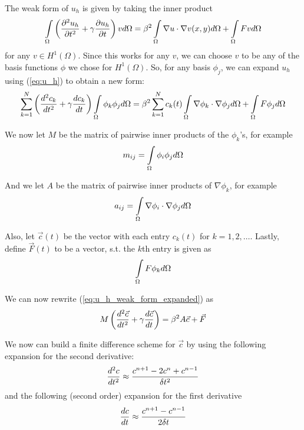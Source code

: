 \documentclass[a4paper,12pt]{article}
\begin{document}
The weak form of $u_h$ is given by taking the inner product 
\begin{equation} \label{eq:u_h_weak_form}
\int\limits_{\Omega}  \left( \frac{\partial^2 u_h}{\partial t^2} + \gamma \frac{\partial u_h}{\partial t} \right)   v  d\Omega
=
\beta^2 \int\limits_{\Omega} \nabla u \cdot \nabla v(x,y) d\Omega
+ \int\limits_{\Omega} F v d\Omega
\end{equation}
for any $v \in H^1(\Omega)$. Since this works for any $v$, we can choose $v$ to be any of the basis functions $\phi$
we chose for $H^1(\Omega)$. So, for any basis $\phi_j$, we can expand $u_h$ using (\ref{eq:u_h}) to obtain a new form:
\begin{equation} \label{eq:u_h_weak_form_expanded}
\sum\limits_{k=1}^N \left( \frac{d^2 c_k}{d t^2} + \gamma\frac{d c_k}{d t} \right) \int\limits_{\Omega} \phi_k \phi_j d\Omega
=
\beta^2\sum\limits_{k=1}^N c_k(t) \int\limits_{\Omega} \nabla \phi_k \cdot \nabla \phi_j d\Omega
+
\int\limits_{\Omega} F \phi_j d\Omega
\end{equation}

We now let $M$ be the matrix of pairwise inner products of the $\phi_k$'s, for example
\begin{equation} \label{eq:m_definition}
m_{ij} = \int\limits_{\Omega} \phi_i \phi_j d\Omega
\end{equation}

And we let $A$ be the matrix of pairwise inner products of $\nabla \phi_k$, for example
\begin{equation} \label{eq:a_definition}
a_{ij} = \int\limits_{\Omega} \nabla \phi_i \cdot \nabla \phi_j d\Omega
\end{equation}

Also, let $\vec{c}(t)$ be the vector with each entry $c_k(t)$ for $k=1, 2, \ldots$. Lastly, define
$\vec{F}(t)$ to be a vector, s.t. the $k$th entry is given as 
\begin{equation} \label{eq:vec_F_definition}
\int\limits_{\Omega} F \phi_k d\Omega
\end{equation}

We can now rewrite (\ref{eq:u_h_weak_form_expanded}) as
\begin{equation} \label{eq:u_h_matrix}
M\left( \frac{d^2 \vec{c}}{d t^2} + \gamma\frac{d \vec{c}}{d t} \right) = \beta^2 A \vec{c} + \vec{F}
\end{equation}

We now can build a finite difference scheme for $\vec{c}$ by using the following expansion for the second derivative:
\begin{equation} \label{eq:second_derivative_finite_difference}
\frac{d^2 c}{d t^2} \approx \frac{c^{n+1} - 2c^n + c^{n-1}}{\delta t^2}
\end{equation}
and the following (second order) expansion for the first derivative
\begin{equation} \label{eq:first_derivative_finite_difference}
\frac{d c}{d t} \approx \frac{c^{n+1} - c^{n-1}}{2\delta t}
\end{equation}
\end{document}
